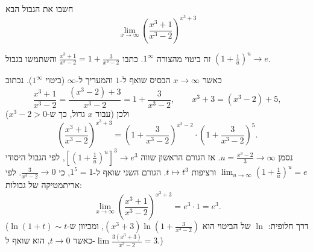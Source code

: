 
\begin{question}
חשבו את הגבול הבא
\[ \lim_{x\to\infty} \left( \frac{x^3 + 1}{x^3 - 2} \right)^{x^3 + 3} \]
\end{question}

\begin{hint}
זה ביטוי מהצורה $1^\infty$. כתבו $\frac{x^3 + 1}{x^3 - 2} = 1 + \frac{3}{x^3 - 2}$ והשתמשו בגבול $\left(1 + \frac{1}{u}\right)^u \to e$.
\end{hint}

\begin{solution}
כאשר $x \to \infty$ הבסיס שואף ל-$1$ והמעריך ל-$\infty$ (ביטוי $1^\infty$). נכתוב
\[ \frac{x^3 + 1}{x^3 - 2} = \frac{(x^3 - 2) + 3}{x^3 - 2} = 1 + \frac{3}{x^3 - 2}, \qquad x^3 + 3 = (x^3 - 2) + 5, \]
ולכן (עבור $x$ גדול, כך ש-$x^3 - 2 > 0$)
\[ \left( \frac{x^3 + 1}{x^3 - 2} \right)^{x^3 + 3} = \left( 1 + \frac{3}{x^3 - 2} \right)^{x^3 - 2} \cdot \left( 1 + \frac{3}{x^3 - 2} \right)^{5}. \]
נסמן $u = \frac{x^3 - 2}{3} \to \infty$. אז הגורם הראשון שווה $\left[\left(1 + \frac{1}{u}\right)^{u}\right]^3 \to e^3$, לפי הגבול היסודי $\lim_{u\to\infty}\left(1 + \frac1u\right)^u = e$ ורציפות $t \mapsto t^3$.
הגורם השני שואף ל-$1^5 = 1$, כי $\frac{3}{x^3 - 2} \to 0$.
לפי אריתמטיקה של גבולות:
\[ \boxed{\lim_{x\to\infty} \left( \frac{x^3 + 1}{x^3 - 2} \right)^{x^3 + 3} = e^3 \cdot 1 = e^3}. \]
(דרך חלופית: $\ln$ של הביטוי הוא $(x^3 + 3)\ln\left(1 + \frac{3}{x^3 - 2}\right)$, ומכיוון ש-$\ln(1 + t) \sim t$ כאשר $t \to 0$, הוא שואף ל-$\lim \frac{3(x^3 + 3)}{x^3 - 2} = 3$.)
\end{solution}
